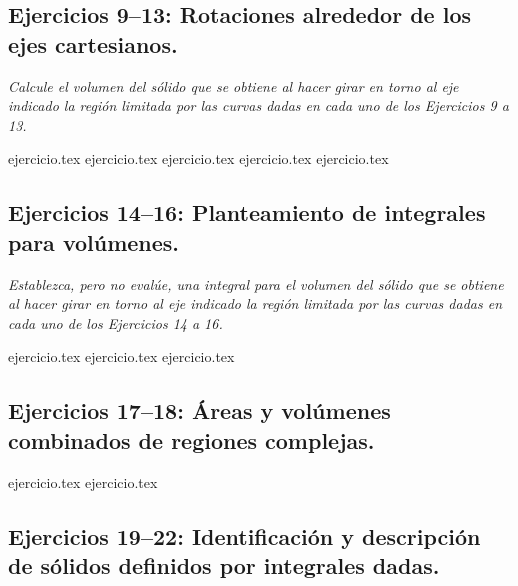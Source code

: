 \subsection*{Ejercicios 9--13: Rotaciones alrededor de los ejes cartesianos.}

\noindent \textit{Calcule el volumen del sólido que se obtiene al hacer girar en torno al eje indicado la región limitada por las curvas dadas en cada uno de los Ejercicios 9 a 13.}

\begin{enumerate}
    \setcounter{enumi}{8}
    {ejercicio.tex}
    {ejercicio.tex}
    {ejercicio.tex}
    {ejercicio.tex}
    {ejercicio.tex}
\end{enumerate}

\subsection*{Ejercicios 14--16: Planteamiento de integrales para volúmenes.}

\noindent \textit{Establezca, pero no evalúe, una integral para el volumen del sólido que se obtiene al hacer girar en torno al eje indicado la región limitada por las curvas dadas en cada uno de los Ejercicios 14 a 16.}

\begin{enumerate}
    \setcounter{enumi}{13}
    {ejercicio.tex}
    {ejercicio.tex}
    {ejercicio.tex}
\end{enumerate}

\subsection*{Ejercicios 17--18: Áreas y volúmenes combinados de regiones complejas.}

\begin{enumerate}
    \setcounter{enumi}{16}
    {ejercicio.tex}
    {ejercicio.tex}
\end{enumerate}

\subsection*{Ejercicios 19--22: Identificación y descripción de sólidos definidos por integrales dadas.}

